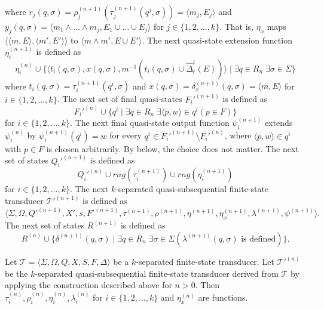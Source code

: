 where $r_j(q, \sigma) = \rho_j^{(n+1)}(\tau_j^{(n+1)}(q^j, \sigma)) = \langle
m_j, E_j \rangle$ and $y_j(q, \sigma) = \langle m_1 \wedge \ldots \wedge m_j, E_1
\cup \ldots \cup E_j \rangle$ for $j \in \{ 1, 2, \ldots, k \}$. That is, $\eta_x$
maps $\langle \langle m, E \rangle, \langle m', E' \rangle \rangle$ to $\langle m
\wedge m', E \cup E' \rangle$.
The next quasi-state extension function $\eta_i^{(n+1)}$ is defined as
\begin{equation*}
  \eta_i^{(n)} \cup \{ \langle t_i(q, \sigma), x(q, \sigma), m^{-1}(t_i(q, \sigma)
  \cup \hat{\Delta}_\epsilon^i(E)) \rangle \mid \exists q \in R_n \; \exists \sigma
  \in \Sigma \}
\end{equation*}
where $t_i(q, \sigma) = \tau_i^{(n+1)}(q^i, \sigma)$ and $x(q, \sigma) =
\delta_x^{(n+1)}(q, \sigma) = \langle m, E \rangle$ for $i \in \{ 1, 2, \ldots, k
\}$.
The next set of final quasi-states $F_i'^{(n+1)}$ is defined as
\begin{equation*}
  F_i'^{(n)} \cup \{ q^i \mid \exists q \in R_n \; \exists \langle p, w \rangle \in
  q^i (p \in F) \}
\end{equation*}
for $i \in \{ 1, 2, \ldots, k \}$.
The next final quasi-state output function $\psi_i^{(n+1)}$ extends $\psi_i^{(n)}$ by
$\psi_i^{(n+1)}(q^i) = w$ for every $q^i \in F_i'^{(n+1)} \setminus F_i'^{(n)}$, where
$\langle p, w \rangle \in q^i$ with $p \in F$ is chosen arbitrarily. By
 below, the choice does not matter.
The next set of states $Q_i'^{(n+1)}$ is defined as
\begin{equation*}
  Q_i'^{(n)} \cup rng(\tau_i^{(n+1)}) \cup rng(\eta_i^{(n+1)})
\end{equation*}
for $i \in \{ 1, 2, \ldots, k \}$.
The next $k$-separated quasi-subsequential finite-state transducer
$\mathcal{T}'^{(n+1)}$ is defined as
\begin{equation*}
  \langle \Sigma, \Omega, Q'^{(n+1)}, X', s, F'^{(n+1)}, \tau^{(n+1)},
  \rho^{(n+1)}, \eta^{(n+1)}, \eta_x^{(n+1)}, \lambda^{(n+1)}, \psi^{(n+1)} \rangle.
\end{equation*}
The next set of states $R^{(n+1)}$ is defined as
\begin{equation*}
  R^{(n)} \cup \{ \delta^{(n+1)}(q, \sigma) \mid \exists q \in R_n \; \exists \sigma
  \in \Sigma (\lambda^{(n+1)}(q, \sigma) \textrm{ is defined}) \}.
\end{equation*}

\begin{proposition}
  Let $\mathcal{T} = \langle \Sigma, \Omega, Q, X, S, F, \Delta \rangle$ be a
  $k$-separated finite-state transducer. Let $\mathcal{T}'^{(n)}$ be the
  $k$-separated quasi-subsequential finite-state transducer derived from
  $\mathcal{T}$ by applying the construction described above for $n > 0$. Then
  $\tau_i^{(n)}, \rho_i^{(n)}, \eta_i^{(n)}, \lambda_i^{(n)}$ for $i \in \{ 1, 2,
  \ldots, k \}$ and $\eta_x^{(n)}$ are functions.
\end{proposition}

